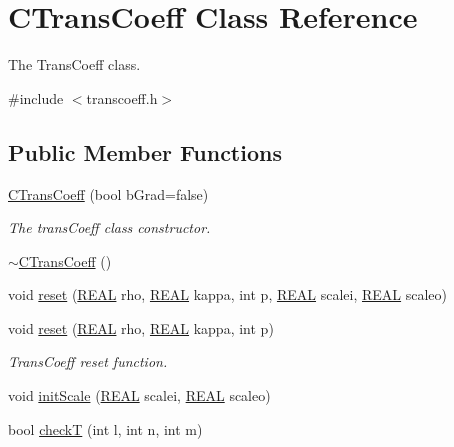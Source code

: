 \hypertarget{classCTransCoeff}{\section{C\-Trans\-Coeff Class Reference}
\label{classCTransCoeff}
}


The Trans\-Coeff class.  




{\ttfamily \#include $<$transcoeff.\-h$>$}

\subsection*{Public Member Functions}
\begin{DoxyCompactItemize}
\item 
\hyperlink{classCTransCoeff_a79a18f1d749a64e16b6d5d509c1aab2e}{C\-Trans\-Coeff} (bool b\-Grad=false)
\begin{DoxyCompactList}\small\item\em The trans\-Coeff class constructor. \end{DoxyCompactList}\item 
\hyperlink{classCTransCoeff_ab8276c5cf90a2b8175349e8c805ac33e}{$\sim$\-C\-Trans\-Coeff} ()
\item 
void \hyperlink{classCTransCoeff_ae2bb4303078853ac8c4337d5fd35cb65}{reset} (\hyperlink{util_8h_a5821460e95a0800cf9f24c38915cbbde}{R\-E\-A\-L} rho, \hyperlink{util_8h_a5821460e95a0800cf9f24c38915cbbde}{R\-E\-A\-L} kappa, int p, \hyperlink{util_8h_a5821460e95a0800cf9f24c38915cbbde}{R\-E\-A\-L} scalei, \hyperlink{util_8h_a5821460e95a0800cf9f24c38915cbbde}{R\-E\-A\-L} scaleo)
\item 
void \hyperlink{classCTransCoeff_ae3bcec2662bcf639fb2bff1723521bdc}{reset} (\hyperlink{util_8h_a5821460e95a0800cf9f24c38915cbbde}{R\-E\-A\-L} rho, \hyperlink{util_8h_a5821460e95a0800cf9f24c38915cbbde}{R\-E\-A\-L} kappa, int p)
\begin{DoxyCompactList}\small\item\em Trans\-Coeff reset function. \end{DoxyCompactList}\item 
void \hyperlink{classCTransCoeff_adeb386e414771bb0809a24649a06fb7d}{init\-Scale} (\hyperlink{util_8h_a5821460e95a0800cf9f24c38915cbbde}{R\-E\-A\-L} scalei, \hyperlink{util_8h_a5821460e95a0800cf9f24c38915cbbde}{R\-E\-A\-L} scaleo)
\item 
bool \hyperlink{classCTransCoeff_aebfff37636999f4be3112643a7cc40db}{check\-T} (int l, int n, int m)

\end{DoxyCompactItemize}
